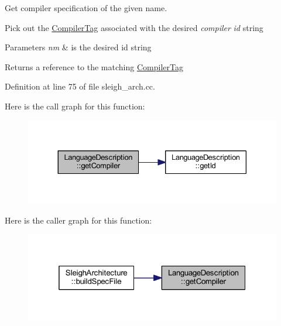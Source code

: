 Get compiler specification of the given name. 

Pick out the \mbox{\hyperlink{class_compiler_tag}{Compiler\+Tag}} associated with the desired {\itshape compiler} {\itshape id} string 
\begin{DoxyParams}{Parameters}
{\em nm} & is the desired id string \\
\hline
\end{DoxyParams}
\begin{DoxyReturn}{Returns}
a reference to the matching \mbox{\hyperlink{class_compiler_tag}{Compiler\+Tag}} 
\end{DoxyReturn}


Definition at line 75 of file sleigh\+\_\+arch.\+cc.

Here is the call graph for this function\+:
\nopagebreak
\begin{figure}[H]
\begin{center}
\leavevmode
\includegraphics[width=330pt]{class_language_description_affb841959c4e35e73211e78048a5e156_cgraph}
\end{center}
\end{figure}
Here is the caller graph for this function\+:
\nopagebreak
\begin{figure}[H]
\begin{center}
\leavevmode
\includegraphics[width=319pt]{class_language_description_affb841959c4e35e73211e78048a5e156_icgraph}
\end{center}
\end{figure}
\mbox{\label{class_language_description_a45e5d45bbe225b5cafed3bfadd5de1e9}} 
